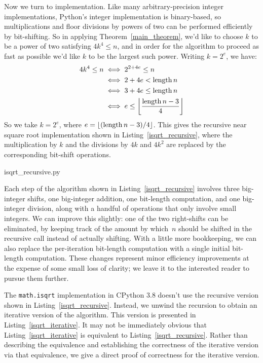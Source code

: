 \documentclass[a4paper]{article}
\DeclarePairedDelimiter\floor{\lfloor}{\rfloor}
\DeclareMathOperator{\length}{length}
\theoremstyle{plain}
\theoremstyle{definition}
\begin{document}
Now we turn to implementation. Like many arbitrary-precision integer
implementations, Python's integer implementation is binary-based, so
multiplications and floor divisions by powers of two can be performed
efficiently by bit-shifting. So in applying Theorem~\ref{main_theorem}, we'd
like to choose $k$ to be a power of two satisfying $4k^4 \le n$, and in order
for the algorithm to proceed as fast as possible we'd like $k$ to be the
largest such power. Writing $k=2^e$, we have:
\begin{align*}
  4k^4 \le n
  &\iff 2^{2 + 4e} \le n \\
  &\iff 2 + 4e < \length n \\
  &\iff 3 + 4e \le \length n \\
  &\iff e \le \floor*{\frac{\length n - 3}{4}}
\end{align*}
So we take $k = 2^e$, where $e={\floor{(\length n - 3)/4}}$. This gives the
recursive near square root implementation shown in
Listing~\ref{isqrt_recursive}, where the multiplication by $k$ and the
divisions by $4k$ and $4k^2$ are replaced by the corresponding bit-shift
operations.


  {isqrt_recursive.py}

Each step of the algorithm shown in Listing~\ref{isqrt_recursive} involves
three big-integer shifts, one big-integer addition, one bit-length computation,
and one big-integer division, along with a handful of operations that only
involve small integers. We can improve this slightly: one of the two
right-shifts can be eliminated, by keeping track of the amount by which~$n$
should be shifted in the recursive call instead of actually shifting. With a
little more bookkeeping, we can also replace the per-iteration bit-length
computation with a single initial bit-length computation. These changes
represent minor efficiency improvements at the expense of some small loss of
clarity; we leave it to the interested reader to pursue them further.

The \lstinline{math.isqrt} implementation in CPython 3.8 doesn't use the
recursive version shown in Listing~\ref{isqrt_recursive}. Instead, we unwind
the recursion to obtain an iterative version of the algorithm. This version is
presented in Listing~\ref{isqrt_iterative}. It may not be immediately obvious
that Listing~\ref{isqrt_iterative} is equivalent to
Listing~\ref{isqrt_recursive}. Rather than describing the equivalence and
establishing the correctness of the iterative version via that equivalence,
we give a direct proof of correctness for the iterative version.
\end{document}
